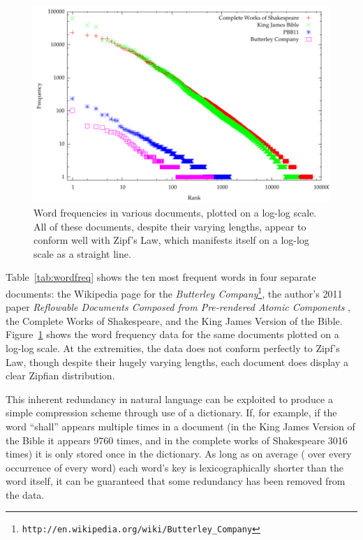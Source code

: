 \begin{figure}
  \begin{center}
  \includegraphics[width=\textwidth]{gnuplot/wordfreq}
  \end{center}
  \caption[Word frequencies in various documents]{Word frequencies in various documents, plotted on a log-log scale. All of these documents, despite their varying lengths, appear to conform well with Zipf's Law, which manifests itself on a log-log scale as a straight line.}
  \label{fig:wordfreq}
\end{figure}

Table~\ref{tab:wordfreq} shows the ten most frequent words in four separate documents: the Wikipedia page for the \emph{Butterley Company}\footnote{\texttt{http://en.wikipedia.org/wiki/Butterley\_Company}}, the author's 2011 paper \emph{Reflowable Documents Composed from Pre-rendered Atomic Components} \cite{Pinkney2011}, the Complete Works of Shakespeare, and the King James Version of the Bible. Figure~\ref{fig:wordfreq} shows the word frequency data for the same documents plotted on a log-log scale. At the extremities, the data does not conform perfectly to Zipf's Law, though despite their hugely varying lengths, each document does display a clear Zipfian distribution.


This inherent redundancy in natural language can be exploited to produce a simple compression scheme through use of a dictionary. If, for example, if the word ``shall'' appears multiple times in a document (in the King James Version of the Bible it appears 9760 times, and in the complete works of Shakespeare 3016 times) it is only stored once in the dictionary. As long as on average (\ie{} over every occurrence of every word) each word's key is lexicographically shorter than the word itself, it can be guaranteed that some redundancy has been removed from the data.

